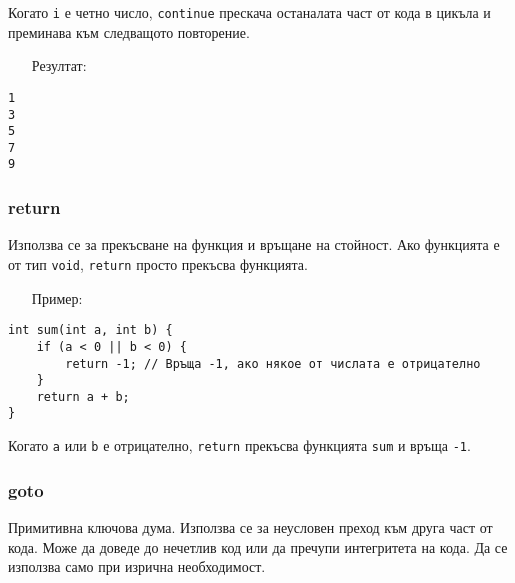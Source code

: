 \documentclass[oneside]{book}
\newcommand*{\code}[1]{\texttt{#1}}
\begin{document}
Когато \code{i} е четно число, \code{continue} прескача останалата част от кода в цикъла и преминава към следващото повторение.
\pagebreak
\begin{itemize}\item[Резултат:]\end{itemize}
\begin{mdframed}\begin{lstlisting}[language={}]
1
3
5
7
9
\end{lstlisting}\end{mdframed}

\subsubsection{return}
Използва се за прекъсване на функция и връщане на стойност. Ако функцията е от тип \code{void}, \code{return} просто прекъсва функцията.

\begin{itemize}\item[Пример:]\end{itemize}
\begin{mdframed}\begin{lstlisting}
int sum(int a, int b) {
    if (a < 0 || b < 0) {
        return -1; // Връща -1, ако някое от числата е отрицателно
    }
    return a + b;
}
\end{lstlisting}\end{mdframed}

Когато \code{a} или \code{b} е отрицателно, \code{return} прекъсва функцията \code{sum} и връща \code{-1}.

\subsubsection{goto}
Примитивна ключова дума. Използва се за неусловен преход към друга част от кода. Може да доведе до нечетлив код или да пречупи интегритета на кода. Да се използва само при изрична необходимост.
\end{document}
